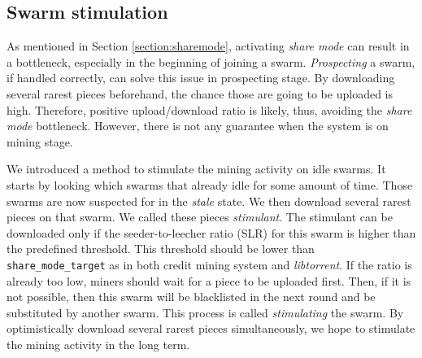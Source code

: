 \subsection{Swarm stimulation}
\label{section:swarmstimulate}
As mentioned in Section \ref{section:sharemode}, activating \textit{share mode} can result in a bottleneck, especially in the beginning of joining a swarm. \textit{Prospecting} a swarm, if handled correctly, can solve this issue in prospecting stage. By downloading several rarest pieces beforehand, the chance those are going to be uploaded is high. Therefore, positive upload/download ratio is likely, thus, avoiding the \textit{share mode} bottleneck. However, there is not any guarantee when the system is on mining stage.

We introduced a method to stimulate the mining activity on idle swarms. It starts by looking which swarms that already idle for some amount of time. Those swarms are now suspected for in the \textit{stale} state. We then download several rarest pieces on that swarm. We called these pieces \textit{stimulant}. The stimulant can be downloaded only if the seeder-to-leecher ratio (SLR) for this swarm is higher than the predefined threshold. This threshold should be lower than \texttt{share\_mode\_target} as in both credit mining system and \textit{libtorrent}. If the ratio is already too low, miners should wait for a piece to be uploaded first. Then, if it is not possible, then this swarm will be blacklisted in the next round and be substituted by another swarm. This process is called \textit{stimulating} the swarm. By optimistically download several rarest pieces simultaneously, we hope to stimulate the mining activity in the long term.